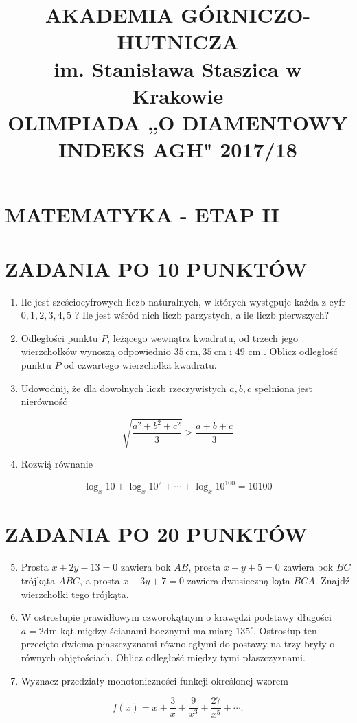 \documentclass[10pt]{article}
\title{AKADEMIA GÓRNICZO-HUTNICZA \\
 im. Stanisława Staszica w Krakowie \\
 OLIMPIADA „O DIAMENTOWY INDEKS AGH" 2017/18 }
\author{}
\date{}
\begin{document}
\maketitle
\section*{MATEMATYKA - ETAP II}
\section*{ZADANIA PO 10 PUNKTÓW}
\begin{enumerate}
  \item Ile jest sześciocyfrowych liczb naturalnych, w których występuje każda z cyfr $0,1,2,3,4,5$ ? Ile jest wśród nich liczb parzystych, a ile liczb pierwszych?
  \item Odległości punktu $P$, leżącego wewnątrz kwadratu, od trzech jego wierzchołków wynoszą odpowiednio $35 \mathrm{~cm}, 35 \mathrm{~cm}$ i 49 cm . Oblicz odległość punktu $P$ od czwartego wierzchołka kwadratu.
  \item Udowodnij, że dla dowolnych liczb rzeczywistych $a, b, c$ spełniona jest nierówność
\end{enumerate}

$$
\sqrt{\frac{a^{2}+b^{2}+c^{2}}{3}} \geqslant \frac{a+b+c}{3}
$$

\begin{enumerate}
  \setcounter{enumi}{3}
  \item Rozwią̇̇ równanie
\end{enumerate}

$$
\log _{x} 10+\log _{x} 10^{2}+\cdots+\log _{x} 10^{100}=10100
$$

\section*{ZADANIA PO 20 PUNKTÓW}
\begin{enumerate}
  \setcounter{enumi}{4}
  \item Prosta $x+2 y-13=0$ zawiera bok $A B$, prosta $x-y+5=0$ zawiera bok $B C$ trójkąta $A B C$, a prosta $x-3 y+7=0$ zawiera dwusieczną kąta $B C A$. Znajdź wierzchołki tego trójkąta.
  \item W ostrosłupie prawidłowym czworokątnym o krawędzi podstawy długości $a=2 \mathrm{dm}$ kąt między ścianami bocznymi ma miarę $135^{\circ}$. Ostrosłup ten przecięto dwiema płaszczyznami równoległymi do postawy na trzy bryły o równych objętościach. Oblicz odległość między tymi płaszczyznami.
  \item Wyznacz przedziały monotoniczności funkcji określonej wzorem
\end{enumerate}

$$
f(x)=x+\frac{3}{x}+\frac{9}{x^{3}}+\frac{27}{x^{5}}+\cdots .
$$
\end{document}
